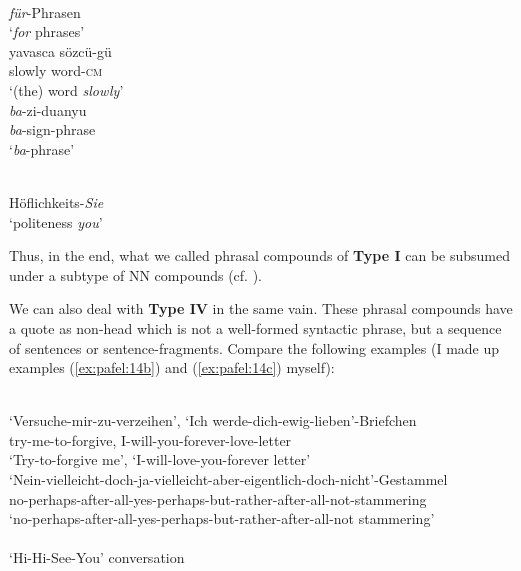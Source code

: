 \documentclass[output=paper]{LSP/langsci}
\begin{document}
      \ex\label{ex:pafel:12b}
      \\
         \textit{für}-Phrasen    \\
      \glt  `\textit{for} phrases'
      \ex\label{ex:pafel:12c}
      \\
      \gll   yavasca sözcü-gü    \\
             slowly word-\textsc{cm}     \\
      \glt  `(the) word \textit{slowly}'
      \ex\label{ex:pafel:12d}
      \\
      \gll   \textit{ba}-zi-duanyu    \\
             \textit{ba}-sign-phrase     \\
      \glt  `\textit{ba}-phrase'
   \z
\z
 
\ea\label{ex:pafel:13}    
      \\
         Höflichkeits-\textit{Sie}    \\
      \glt  `politeness \textit{you}'
\z

Thus, in the end, what we called phrasal compounds of \textbf{Type I} can be subsumed under a subtype of NN compounds (cf. \citealt{Goksel2015}).
 
We can also deal with \textbf{Type IV} in the same vain. These phrasal compounds have a quote as non-head which is not a well-formed syntactic phrase, but a sequence of sentences or sentence-fragments. Compare the following examples (I made up examples (\ref{ex:pafel:14b}) and (\ref{ex:pafel:14c}) myself):\largerpage[2]

\ea
      \ea\label{ex:pafel:14a}
      \\
       `Versuche-mir-zu-verzeihen', `Ich werde-dich-ewig-lieben'-Briefchen   \\
            try-me-to-forgive, I-will-you-forever-love-letter\\
       `Try-to-forgive me', `I-will-love-you-forever letter'
      \ex\label{ex:pafel:14b}
      \\
         `Nein-vielleicht-doch-ja-vielleicht-aber-eigentlich-doch-nicht'-Gestammel\\
         no-perhaps-after-all-yes-perhaps-but-rather-after-all-not-stammering    \\
        `no-perhaps-after-all-yes-perhaps-but-rather-after-all-not stammering'\\
      \ex\label{ex:pafel:14c} \\
         `Hi-Hi-See-You' conversation\\
    \z
\z      
\end{document}
